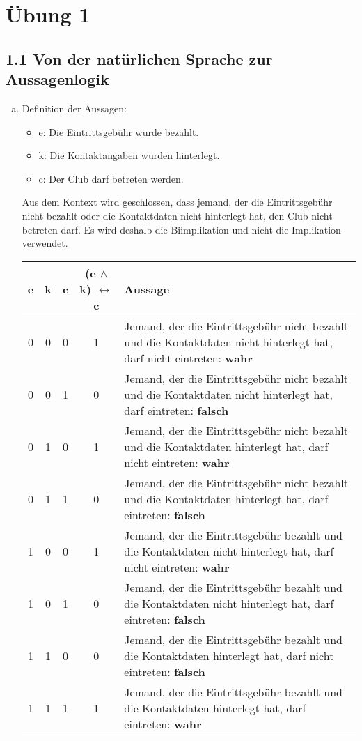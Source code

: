 \documentclass[12pt,a4paper]{article}
\begin{document}
\section*{Übung 1}
\subsection*{1.1 Von der natürlichen Sprache zur Aussagenlogik}
\begin{enumerate}[a)]
\item Definition der Aussagen:
\begin{itemize}
\item e: Die Eintrittsgebühr wurde bezahlt.
\item k: Die Kontaktangaben wurden hinterlegt.
\item c: Der Club darf betreten werden.
\end{itemize}

Aus dem Kontext wird geschlossen, dass jemand, der die Eintrittsgebühr nicht bezahlt oder die Kontaktdaten nicht hinterlegt hat, den Club nicht betreten darf. Es wird deshalb die Biimplikation und nicht die Implikation verwendet.


\begin{tabular}{c|c|c|c|p{}}
e & k & c & (e $\land$ k) $\leftrightarrow$ c & Aussage\\
\hline
0 & 0 & 0 & 1 & Jemand, der die Eintrittsgebühr nicht bezahlt und die Kontaktdaten nicht hinterlegt hat, darf nicht eintreten: \textbf{wahr}\\
\hline
0 & 0 & 1 & 0 & Jemand, der die Eintrittsgebühr nicht bezahlt und die Kontaktdaten nicht hinterlegt hat, darf  eintreten: \textbf{falsch}\\
\hline

0 & 1 & 0 & 1 & Jemand, der die Eintrittsgebühr nicht bezahlt und die Kontaktdaten hinterlegt hat, darf nicht eintreten: \textbf{wahr}\\
\hline
0 & 1 & 1 & 0 & Jemand, der die Eintrittsgebühr nicht bezahlt und die Kontaktdaten hinterlegt hat, darf eintreten: \textbf{falsch}\\
\hline
1 & 0 & 0 & 1 & Jemand, der die Eintrittsgebühr bezahlt und die Kontaktdaten nicht hinterlegt hat, darf nicht eintreten: \textbf{wahr}\\
\hline
1 & 0 & 1 & 0 & Jemand, der die Eintrittsgebühr bezahlt und die Kontaktdaten nicht hinterlegt hat, darf eintreten: \textbf{falsch}\\
\hline
1 & 1 & 0 & 0 & Jemand, der die Eintrittsgebühr bezahlt und die Kontaktdaten hinterlegt hat, darf nicht eintreten: \textbf{falsch}\\
\hline
1 & 1 & 1 & 1 & Jemand, der die Eintrittsgebühr bezahlt und die Kontaktdaten hinterlegt hat, darf eintreten:\textbf{ wahr}\\
\end{tabular}


\end{enumerate}
\end{document}
